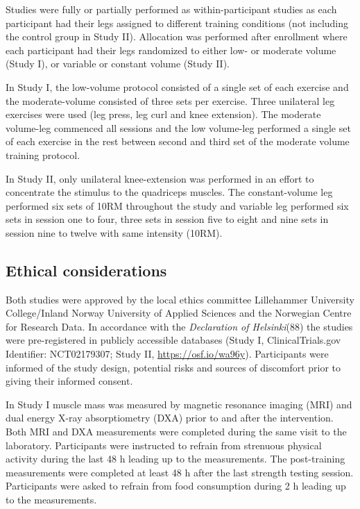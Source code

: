 \documentclass[twoside,10pt]{gihclass} %
\begin{document}
Studies were fully or partially performed as within-participant studies
as each participant had their legs assigned to different training
conditions (not including the control group in Study II). Allocation was
performed after enrollment where each participant had their legs
randomized to either low- or moderate volume (Study I), or variable or
constant volume (Study II).

In Study I, the low-volume protocol consisted of a single set of each
exercise and the moderate-volume consisted of three sets per exercise.
Three unilateral leg exercises were used (leg press, leg curl and knee
extension). The moderate volume-leg commenced all sessions and the low
volume-leg performed a single set of each exercise in the rest between
second and third set of the moderate volume training protocol.

In Study II, only unilateral knee-extension was performed in an effort
to concentrate the stimulus to the quadriceps
muscles. The constant-volume leg performed six sets
of 10RM throughout the study and variable leg performed six sets in
session one to four, three sets in session five to eight and nine sets
in session nine to twelve with same intensity (10RM).

\hypertarget{ethical-considerations}{%
\subsection{Ethical considerations}\label{ethical-considerations}}

Both studies were approved by the local ethics committee Lillehammer
University College/Inland Norway University of Applied Sciences and the
Norwegian Centre for Research Data. In accordance with the \emph{Declaration
of Helsinki}(88) the studies were pre-registered in publicly
accessible databases (Study I, ClinicalTrials.gov Identifier:
NCT02179307; Study II, \url{https://osf.io/wa96y}). Participants were
informed of the study design, potential risks and sources of discomfort
prior to giving their informed consent.

In Study I muscle mass was measured by magnetic resonance imaging (MRI)
and dual energy X-ray absorptiometry (DXA) prior to and after the
intervention. Both MRI and DXA measurements were completed during the
same visit to the laboratory. Participants were instructed to refrain
from strenuous physical activity during the last 48 h leading up to the
measurements. The post-training measurements were completed at least 48
h after the last strength testing session. Participants were asked to
refrain from food consumption during 2 h leading up to the measurements.
\end{document}
